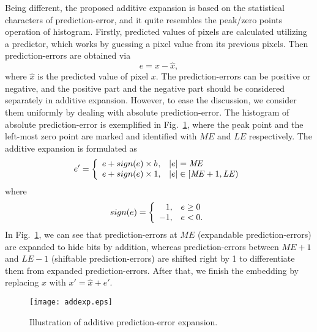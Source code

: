\documentclass{sig-alternate}
\begin{document}
Being different, the proposed additive expansion is based on the statistical characters of
prediction-error, and it quite resembles the peak/zero points operation of histogram. Firstly,
predicted values of pixels are calculated utilizing a predictor, which works by guessing a pixel
value from its previous pixels. Then prediction-errors are obtained via
\begin{equation}
  e = x - \hat{x},
\end{equation}
where $\hat{x}$ is the predicted value of pixel $x$. The prediction-errors can be positive or
negative, and the positive part and the negative part should be considered separately in additive
expansion. However, to ease the discussion, we consider them uniformly by dealing with absolute
prediction-error. The histogram of absolute prediction-error is exemplified in Fig.\
\ref{fig:addexp}, where the peak point and the left-most zero point are marked and identified with
$\mathit{ME}$ and $\mathit{LE}$ respectively. The additive expansion is formulated as
\begin{equation}\label{eqn:ape}
 e' = \left\{ \begin{array}{l@{,\quad}l}
  e + sign(e) \times b & |e| = \mathit{ME} \\
  e + sign(e) \times 1 & |e| \in [\mathit{ME}+1,\mathit{LE}) \\
\end{array} \right.
\end{equation}
where
\begin{equation}
  sign(e) = \left\{ \begin{array}{r@{,\quad}l}
    1 & e \ge 0 \\ -1 & e < 0.
  \end{array} \right.
\end{equation}
In Fig.\ \ref{fig:addexp}, we can see that prediction-errors at $\mathit{ME}$ (expandable
prediction-errors) are expanded to hide bits by addition, whereas prediction-errors between
$\mathit{ME+1}$ and $\mathit{LE-1}$ (shiftable prediction-errors) are shifted right by 1 to
differentiate them from expanded prediction-errors. After that, we finish the embedding by replacing
$x$ with $x' = \hat{x} + e'$.

\begin{figure}[t]
  \centering
  \texttt{[image: addexp.eps]}
  \caption{\label{fig:addexp}Illustration of additive prediction-error expansion.}
\end{figure}
\end{document}
